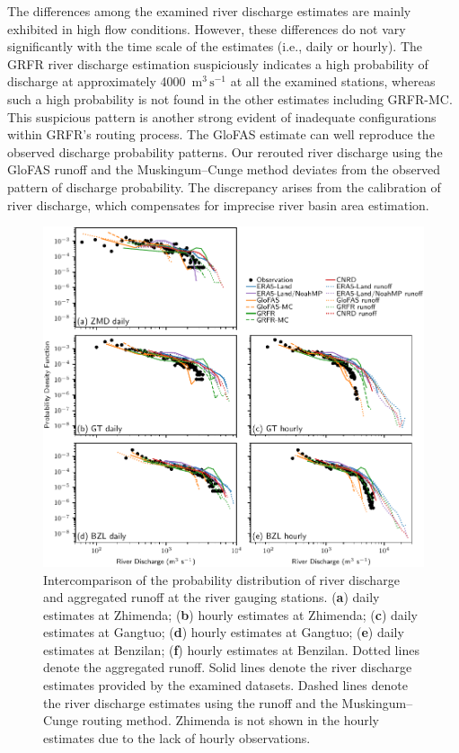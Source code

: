 \documentclass[water,article,submit,pdftex,moreauthors]{Definitions/mdpi}
\begin{document}
The differences among the examined river discharge estimates are mainly exhibited in high flow conditions. However, these differences do not vary significantly with the time scale of the estimates (i.e., daily or hourly). The GRFR river discharge estimation suspiciously indicates a high probability of discharge at approximately 4000~$\mathrm{m^3\,s^{-1}}$ at all the examined stations, whereas such a high probability is not found in the other estimates including GRFR-MC. This suspicious pattern is another strong evident of inadequate configurations within GRFR's routing process. The GloFAS estimate can well reproduce the observed discharge probability patterns. Our rerouted river discharge using the GloFAS runoff and the Muskingum--Cunge method deviates from the observed pattern of discharge probability. The discrepancy arises from the calibration of river discharge, which compensates for imprecise river basin area estimation.

\begin{figure}[H]
  \centering
  \includegraphics[width=\textwidth]{streamflow_runoff_dist.pdf}
  \caption{Intercomparison of the probability distribution of river discharge and aggregated runoff at the river gauging stations. (\textbf{a}) daily estimates at Zhimenda; (\textbf{b}) hourly estimates at Zhimenda; (\textbf{c}) daily estimates at Gangtuo; (\textbf{d}) hourly estimates at Gangtuo; (\textbf{e}) daily estimates at Benzilan; (\textbf{f}) hourly estimates at Benzilan. Dotted lines denote the aggregated runoff. Solid lines denote the river discharge estimates provided by the examined datasets. Dashed lines denote the river discharge estimates using the runoff and the Muskingum--Cunge routing method. Zhimenda is not shown in the hourly estimates due to the lack of hourly observations.}
  \label{fig:streamflow_runoff_dist}
\end{figure}
\end{document}
